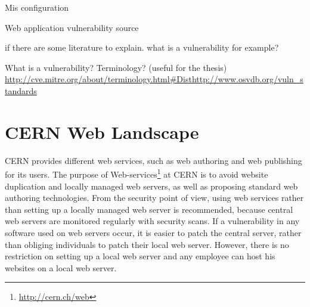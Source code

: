 Mis configuration

Web application
vulnerability source

if there are some literature to explain. what is a vulnerability for example?

What is a vulnerability? Terminology? (useful for the thesis) 
\url{http://cve.mitre.org/about/terminology.html#Dist}\url{http://www.osvdb.org/vuln_standards}

\section{CERN Web Landscape}

CERN provides different web services, such as web authoring and web publishing for its users. The purpose of Web-services\footnote{\url{http://cern.ch/web}} at CERN is to avoid website duplication and locally managed web servers, as well as proposing standard web authoring technologies. From the security point of view, using web services rather than setting up a locally managed web server is recommended, because central web servers are monitored regularly with security scans. If a vulnerability in any software used on web servers occur, it is easier to patch the central server, rather than obliging individuals to patch their local web server. However, there is no restriction on setting up a local web server and any employee can host his websites on a local web server. 

